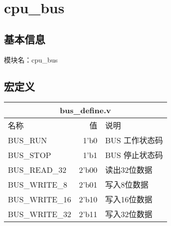 \section{cpu\_bus}
\subsection{基本信息}
模块名：cpu\_bus\\
\subsection{宏定义}
\begin{tabular}{|l|r|l|}
    \hline
    \multicolumn{3}{|c|}{bus\_define.v}\\\hline
    名称    &   值  &   说明\\\hline
    BUS\_RUN     &      1'b0   &  BUS 工作状态码\\ \hline
    BUS\_STOP    &      1'b1   &  BUS 停止状态码\\ \hline
    BUS\_READ\_32  & 2'b00 & 读出32位数据 \\ \hline
    BUS\_WRITE\_8  & 2'b01 & 写入8位数据 \\ \hline
    BUS\_WRITE\_16 & 2'b10 & 写入16位数据 \\ \hline
    BUS\_WRITE\_32 & 2'b11 & 写入32位数据 \\ \hline
\end{tabular}
